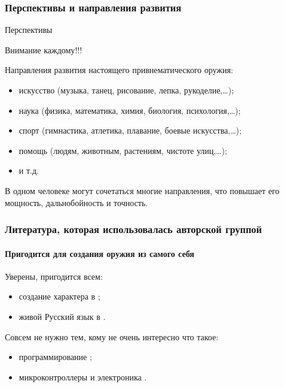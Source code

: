 \begin{frame}
    \frametitle{Перспективы и направления развития}
    
    \begin{block}{Перспективы}
        \begin{center}
            Внимание \alert{каждому}!!!
        \end{center}
    \end{block}
    
    Направления развития \alert{настоящего} привнематического оружия: 
    \begin{itemize}
        \item искусство (музыка, танец, рисование, лепка, рукоделие,\ldots);
        \item наука (физика, математика, химия, биология, психология,\ldots);
        \item спорт (гимнастика, атлетика, плавание, боевые искусства,\ldots);
        \item помощь (людям, животным, растениям, чистоте улиц,\ldots);
        \item и т.д.
    \end{itemize}
    
    \begin{block}{}
        \begin{center}
            В \alert{одном} человеке могут сочетаться \alert{многие} направления, что повышает его \alert{мощность}, \alert{дальнобойность} и \alert{точность}.
        \end{center}
    \end{block}
    
\end{frame}


\appendix

\begin{frame}
    \frametitle{Литература, которая использовалась авторской группой}
    \framesubtitle{Пригодится для создания оружия из самого себя}

    Уверены, пригодится всем:
    \begin{itemize}
        \item создание характера в \cite{bib:kovey:sevenHabits};
        \item живой Русский язык в \cite{bib:gal:WordLiveAndDeath}.
    \end{itemize}
    
    \par\bigskip
    
    \alert{Совсем не нужно} тем, кому не очень интересно что такое:
    \begin{itemize}
        \item программирование \cite{bib:kernigan:practice};
        \item микроконтроллеры и электроника \cite{bib:margolis:Arduino}.
    \end{itemize}
\end{frame}

